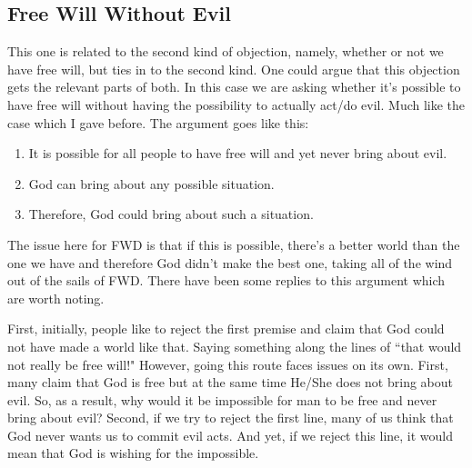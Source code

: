 \subsection{Free Will Without Evil}

This one is related to the second kind of objection, namely, whether or not we have free will, but ties in to the second kind. One could argue that this objection gets the relevant parts of both. In this case we are asking whether it's possible to have free will without having the possibility to actually act/do evil. Much like the case which I gave before. The argument goes like this:

\begin{enumerate}
   \item It is possible for all people to have free will and yet never bring about evil.
    \item God can bring about any possible situation.
    \item Therefore, God could bring about such a situation.
\end{enumerate}

The issue here for FWD is that if this is possible, there's a better world than the one we have and therefore God didn't make the best one, taking all of the wind out of the sails of FWD.  There have been some replies to this argument which are worth noting.

First, initially, people like to reject the first premise and claim that God could not have made a world like that. Saying something along the lines of ``that would not really be free will!" However, going this route faces issues on its own. First, many claim that God is free but at the same time He/She does not bring about evil. So, as a result, why would it be impossible for man to be free and never bring about evil? Second, if we try to reject the first line, many of us think that God never wants us to commit evil acts. And yet, if we reject this line, it would mean that God is wishing for the impossible.

